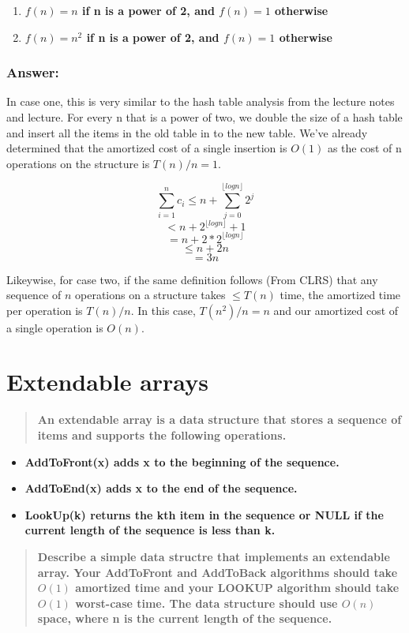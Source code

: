 \documentclass[titlepage]{article}\usepackage[]{graphicx}\usepackage[]{color}
\begin{document}
\begin{enumerate}
  \item \textbf{ $f(n) = n$ if n is a power of 2, and $f(n) = 1$ otherwise}
  \item \textbf{ $f(n) = n^2$ if n is a power of 2, and $f(n) = 1$ otherwise}
\end{enumerate}

\subsubsection{Answer: }
In case one, this is very similar to the hash table analysis from the lecture
notes and lecture. For every n that is a power of two, we double the size of a
hash table and insert all the items in the old table in to the new table. We've
already determined that the amortized cost of a single insertion is $O(1)$ as
the cost of n operations on the structure is $T(n)/n = 1$. 

\[ \sum_{i=1}^n c_i \leq n + \sum_{j=0}^{\lfloor log n \rfloor} 2^j \]
\[ < n + 2^{\lfloor log n \rfloor} +1 \]
\[ = n + 2 * 2^{\lfloor log n \rfloor} \] 
\[\leq n + 2n \]
\[ = 3n \]

Likeywise, for case two, if the same definition follows (From CLRS) that any
sequence of $n$ operations on a structure takes $\leq T(n)$ time, the amortized
time per operation is $T(n)/n$. In this case, $T(n^2)/n = n$ and our amortized
cost of a single operation is $O(n)$. 


\section{Extendable arrays}
\begin{quote}
  \textbf{An extendable array is a data structure that stores a sequence of
  items and supports the following operations.}
\end{quote}

\begin{itemize}
  \item \textbf{AddToFront(x) adds x to the beginning of the sequence.}
  \item \textbf{AddToEnd(x) adds x to the end of the sequence.}
  \item \textbf{LookUp(k) returns the kth item in the sequence or NULL if the
	current length of the sequence is less than k. }
\end{itemize}
\begin{quote}
  \textbf{Describe a simple data structre that implements an extendable array.
	Your AddToFront and AddToBack algorithms should take $O(1)$ amortized time
	and your LOOKUP algorithm should take $O(1)$ worst-case time. The data
	structure should use $O(n)$ space, where n is the current length of the
  sequence.}
\end{quote}
\end{document}
